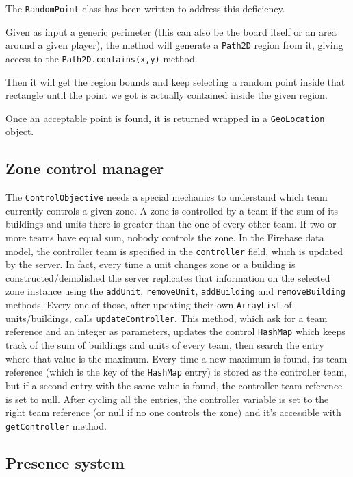 			The \lstinline|RandomPoint| class has been written to address this deficiency.
			
			Given as input a generic perimeter (this can also be the board itself or an area around a given player), the method will generate a \lstinline|Path2D| region from it, giving access to the \lstinline|Path2D.contains(x,y)| method.
			
			Then it will get the region bounds and keep selecting a random point inside that rectangle until the point we got is actually contained inside the given region.
			
			Once an acceptable point is found, it is returned wrapped in a \lstinline|GeoLocation| object.
		
		\subsection{Zone control manager}\label{focus:control}
		
			The \lstinline|ControlObjective| needs a special mechanics to understand which team currently controls a given zone.
			A zone is controlled by a team if the sum of its buildings and units there is greater than the one of every other team.
			If two or more teams have equal sum, nobody controls the zone.
			In the Firebase data model, the controller team is specified in the \lstinline|controller| field, which is updated by the server.
			In fact, every time a unit changes zone or a building is constructed/demolished the server replicates that information on the selected zone instance using the \lstinline|addUnit|, \lstinline|removeUnit|, \lstinline|addBuilding| and \lstinline|removeBuilding| methods.
			Every one of those, after updating their own \lstinline|ArrayList| of units/buildings, calls \lstinline|updateController|.
			This method, which ask for a team reference and an integer as parameters, updates the control \lstinline|HashMap| which keeps track of the sum of buildings and units of every team, then search the entry where that value is the maximum.
			Every time a new maximum is found, its team reference (which is the key of the \lstinline|HashMap| entry) is stored as the controller team, but if a second entry with the same value is found, the controller team reference is set to null.
			After cycling all the entries, the controller variable is set to the right team reference (or null if no one controls the zone) and it's accessible with \lstinline|getController| method.
		
		\subsection{Presence system}\label{focus:presence}

